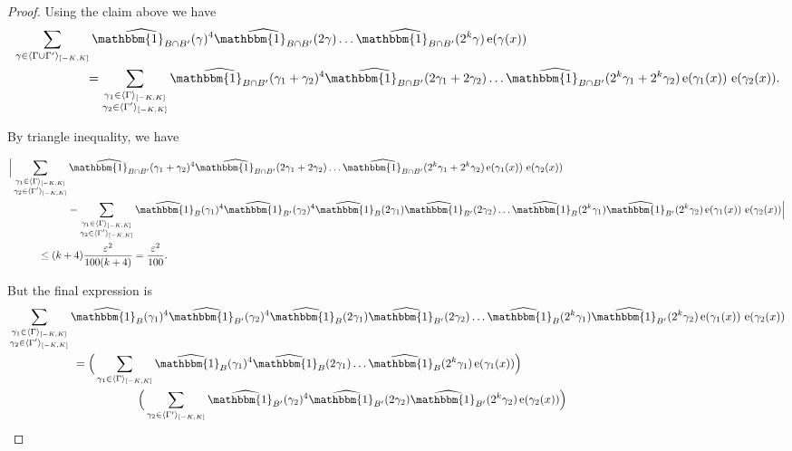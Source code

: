 \documentclass[a4paper,11pt]{article}
\numberwithin{theorem}{section}
\theoremstyle{definition}
\newcommand\id{\mathbbm{1}}
\newcommand{\on}[1]{
	\operatorname{#1}
}
\newcommand\ssk[1]{
	\substack{#1}
}
\begin{document}
\begin{proof}
    Using the claim above we have
    \begin{align*}&\sum_{\gamma \in \langle \Gamma \cup \Gamma'\rangle_{[-K, K]}} \widehat{\id_{B \cap B'}}(\gamma)^4 \widehat{\id_{B \cap B'}}(2\gamma)\dots \widehat{\id_{B \cap B'}}(2^k\gamma)\on{e}(\gamma(x))\\
    &\hspace{2cm} =\sum_{\ssk{\gamma_1 \in \langle \Gamma\rangle_{[-K, K]}\\\gamma_2 \in \langle \Gamma'\rangle_{[-K, K]}}} \widehat{\id_{B \cap B'}}(\gamma_1 + \gamma_2)^4 \widehat{\id_{B \cap B'}}(2\gamma_1 + 2\gamma_2)\dots \widehat{\id_{B \cap B'}}(2^k\gamma_1 + 2^k \gamma_2)\on{e}(\gamma_1(x))\,\on{e}(\gamma_2(x)).\end{align*}

    By triangle inequality, we have

    \begin{align*}
        &\Big|\sum_{\ssk{\gamma_1 \in \langle \Gamma\rangle_{[-K, K]}\\\gamma_2 \in \langle \Gamma'\rangle_{[-K, K]}}} \widehat{\id_{B \cap B'}}(\gamma_1 + \gamma_2)^4 \widehat{\id_{B \cap B'}}(2\gamma_1 + 2\gamma_2)\dots \widehat{\id_{B \cap B'}}(2^k\gamma_1 + 2^k \gamma_2)\on{e}(\gamma_1(x))\,\on{e}(\gamma_2(x))\\
        &\hspace{2cm}-\sum_{\ssk{\gamma_1 \in \langle \Gamma\rangle_{[-K, K]}\\\gamma_2 \in \langle \Gamma'\rangle_{[-K, K]}}} \widehat{\id_{B}}(\gamma_1)^4 \widehat{\id_{B'}}(\gamma_2)^4 \widehat{\id_{B}}(2\gamma_1) \widehat{\id_{B'}}(2\gamma_2)\dots \widehat{\id_{B}}(2^k\gamma_1) \widehat{\id_{B'}}(2^k\gamma_2)\on{e}(\gamma_1(x))\,\on{e}(\gamma_2(x))\Big|\\
        &\hspace{1cm}\leq (k+4) \frac{\varepsilon^2}{100(k+4)} = \frac{\varepsilon^2}{100}.
    \end{align*}

    But the final expression is 
    \begin{align*}&\sum_{\ssk{\gamma_1 \in \langle \Gamma\rangle_{[-K, K]}\\\gamma_2 \in \langle \Gamma'\rangle_{[-K, K]}}} \widehat{\id_{B}}(\gamma_1)^4 \widehat{\id_{B'}}(\gamma_2)^4 \widehat{\id_{B}}(2\gamma_1) \widehat{\id_{B'}}(2\gamma_2)\dots \widehat{\id_{B}}(2^k\gamma_1) \widehat{\id_{B'}}(2^k\gamma_2)\on{e}(\gamma_1(x))\,\on{e}(\gamma_2(x)) \\
    &\hspace{2cm} = \Big(\sum_{\gamma_1 \in \langle \Gamma\rangle_{[-K, K]}}\widehat{\id_{B}}(\gamma_1)^4 \widehat{\id_{B}}(2\gamma_1) \dots \widehat{\id_{B}}(2^k\gamma_1)\on{e}(\gamma_1(x)) \Big) \\
    &\hspace{4cm}\Big(\sum_{\gamma_2 \in \langle \Gamma'\rangle_{[-K, K]}} \widehat{\id_{B'}}(\gamma_2)^4  \widehat{\id_{B'}}(2\gamma_2)\widehat{\id_{B'}}(2^k\gamma_2)\on{e}(\gamma_2(x))\Big)\end{align*}


\end{proof}
\end{document}
